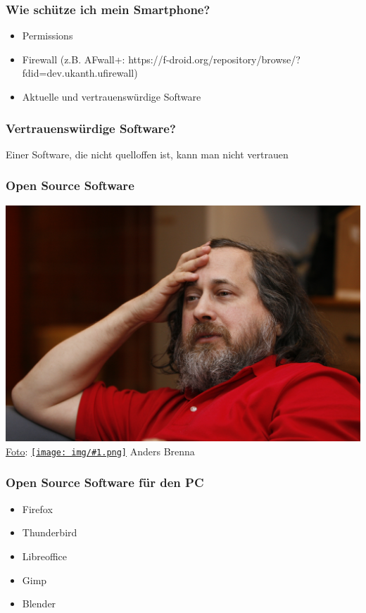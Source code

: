 \documentclass[12pt]{beamer}
\newcommand{\cc}[1]{\texttt{[image: img/\#1.png]}\hspace{1mm}}
\begin{document}
\begin{frame}
    \frametitle{Wie schütze ich mein Smartphone?}
    \begin{itemize}
      \item Permissions
      \item Firewall (z.B. AFwall+: https://f-droid.org/repository/browse/?fdid=dev.ukanth.ufirewall)
      \item Aktuelle und vertrauenswürdige Software
    \end{itemize}
\end{frame}

\begin{frame}
    \frametitle{Vertrauenswürdige Software?}
    \begin{center}\Large
        Einer Software, die nicht quelloffen ist, kann man nicht vertrauen
    \end{center}
\end{frame}

\begin{frame}
    \frametitle{Open Source Software}
    \begin{center}
      \includegraphics[height=0.7\textheight]{img/stallman.jpg}
      \\{\small \href{http://tekniskbeta.no/frie-cc-bilder-av-richard-stallman/}{Foto}: \href{http://creativecommons.org/licenses/by/3.0/no/}{\cc{by}} Anders Brenna}
    \end{center}
\end{frame}

\begin{frame}
    \frametitle{Open Source Software für den PC}
    \begin{itemize}
      \item Firefox
      \item Thunderbird
      \item Libreoffice
      \item Gimp
      \item Blender
    \end{itemize}
\end{frame}
\end{document}
